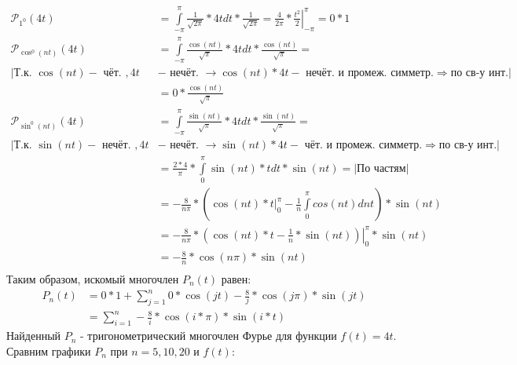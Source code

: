 \documentclass[12pt, a4paper]{article}
\begin{document}
\begin{equation*}
\begin{aligned}
\mathcal{P}_{1^0}(4t) &=  \int\limits_{-\pi}^{\pi} \frac{1}{\sqrt{2\pi}}* 4t dt * \frac{1}{\sqrt{2\pi}} = \frac{4}{2\pi} * \left.\frac{t^2}{2}\right|_{-\pi}^{\pi}=0 * 1\\
\mathcal{P}_{\cos^0(nt)}(4t) &=  \int\limits_{-\pi}^{\pi} \frac{\cos(nt)}{\sqrt{\pi}}* 4t dt * \frac{\cos(nt)}{\sqrt{\pi}} =\\
\left|\text{Т.к. } \cos(nt) - \text{ чёт. } , 4t\right.&\left.- \text{ нечёт. } \rightarrow \cos(nt)*4t-\text{ нечёт. и промеж. симметр.} \Rightarrow \text{по св-у инт.}\right|\\
& = 0 * \frac{\cos(nt)}{\sqrt{\pi}}\\
\mathcal{P}_{\sin^0(nt)}(4t) &=  \int\limits_{-\pi}^{\pi} \frac{\sin(nt)}{\sqrt{\pi}}* 4t dt * \frac{\sin(nt)}{\sqrt{\pi}} =\\
\left|\text{Т.к. } \sin(nt) - \text{ нечёт. } , 4t\right.&\left.- \text{ нечёт. } \rightarrow \sin(nt)*4t-\text{ чёт. и промеж. симметр.} \Rightarrow \text{по св-у инт.}\right|\\
& = \frac{2*4}{\pi}* \int\limits_{0}^{\pi} \sin(nt)*t dt * \sin(nt) =\left|\text{По частям}\right|\\
&= -\frac{8}{n\pi}*\left(\left. \cos(nt)* t \right|_{0}^{\pi} - \frac{1}{n}\int\limits_{0}^{\pi} cos(nt) d nt  \right) * \sin(nt)\\
&= -\frac{8}{n\pi}*\left.\left(\cos(nt)* t - \frac{1}{n}*\sin(nt)  \right)\right|_0^{\pi} * \sin(nt)\\
&= -\frac{8}{n}*\cos(n\pi) * \sin(nt)\\
\end{aligned}
\end{equation*}
Таким образом, искомый многочлен  $P_n(t)$ равен:
\begin{equation*}
\begin{aligned}
P_n(t)&=0*1 + \sum_{j=1}^n 0*\cos(jt) - \frac{8}{j}*\cos(j\pi) * \sin(jt)\\
&= \sum_{i=1}^n - \frac{8}{i}*\cos(i*\pi) * \sin(i*t)
\end{aligned}
\end{equation*}
Найденный $P_n$ - тригонометрический многочлен Фурье для функции $f(t)=4t$. Сравним графики $P_n$ при $n=5, 10, 20$ и $f(t)$:
\end{document}
